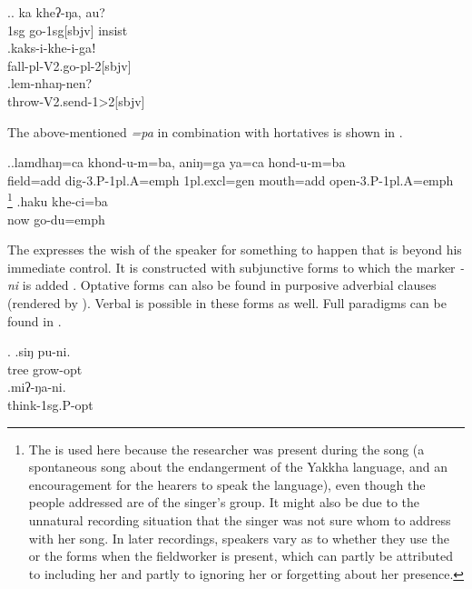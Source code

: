 \ex.\ag. ka kheʔ-ŋa, au?\\
  {\sc 1sg} go{\sc -1sg[sbjv]} {\sc insist}\\
  \bg.kaks-i-khe-i-gaǃ\\
  fall{\sc -pl-V2.go-pl-2[sbjv]}\\
  \bg.lem-nhaŋ-nen?\\
  throw{\sc -V2.send-1>2[sbjv]}\\
  
The above-mentioned  \emph{=pa} in combination with hortatives is shown in \Next.
  
  \ex.\ag.lamdhaŋ=ca        khond-u-m=ba, aniŋ=ga ya=ca           hond-u-m=ba\\
 field{\sc =add} dig{\sc -3.P-1pl.A=emph} {\sc 1pl.excl=gen} mouth{\sc =add} open{\sc -3.P-1pl.A=emph}\\
 \footnote{The  is used here because the researcher was present during the song (a spontaneous song about the endangerment of the Yakkha language, and an encouragement for the hearers to speak the language), even though the people addressed are of the singer's group. It might also be due to the unnatural recording situation that the singer was not sure whom to address with her song. In later recordings, speakers vary as to whether they use the  or the  forms when the fieldworker is present, which can partly be attributed to including her and partly to ignoring her or forgetting about her presence.}  
  \bg.haku khe-ci=ba\\
  now go{\sc -du=emph}\\
  
  
  The  expresses the wish of the speaker for something to happen that is beyond his immediate control. It is constructed with subjunctive forms to which the marker \emph{-ni}  is added \Next. Optative forms can also be found in purposive adverbial clauses (rendered by ). Verbal  is possible in these forms as well. Full paradigms can be found in .
  
  \ex. \ag.siŋ pu-ni.\\
  tree grow{\sc [3sg]-opt}\\
  \bg.miʔ-ŋa-ni.\\
  think{\sc -1sg.P-opt}\\
 
